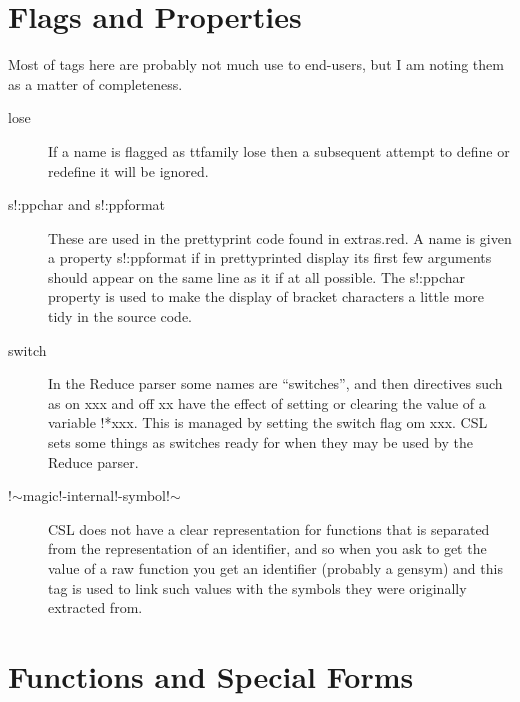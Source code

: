 \documentclass[a4paper,11pt]{article}
\begin{document}
\section{Flags and Properties}
  
Most of tags here are probably not much use to end-users, but I am
noting them as a matter of completeness.
  
\begin{description}

\item [{\ttfamily lose}] 
If a name is flagged as {ttfamily lose} then a subsequent attempt to
define or redefine it will be ignored.

\item [{\ttfamily s!:ppchar} and {\ttfamily s!:ppformat}] 
These are used in the prettyprint code found in {\ttfamily extras.red}. A
name is given a property {\ttfamily s!:ppformat} if in prettyprinted display
its first few arguments should appear on the same line as it if at all
possible. The {\ttfamily s!:ppchar} property is used to make the display of
bracket characters a little more tidy in the source code.

\item [{\ttfamily switch}] 
In the Reduce parser some names are ``switches'', and then directives such
as {\ttfamily on xxx} and {\ttfamily off xx} have the effect of setting or
clearing the value of a variable {\ttfamily !*xxx}. This is managed by
setting the {\ttfamily switch} flag om {\ttfamily xxx}. CSL sets some
things as switches ready for when they may be used by the Reduce parser.

\item [{\ttfamily !$\sim$magic!-internal!-symbol!$\sim$}] 
CSL does not have a clear representation for functions that is separated from
the representation of an identifier, and so when you ask to get the value
of a raw function you get an identifier (probably a gensym) and this
tag is used to link such values with the symbols they were originally
extracted from.

\end{description} %

\section{Functions and Special Forms}
  
\end{document}
